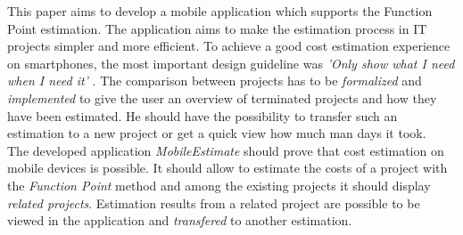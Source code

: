 This paper aims to develop a mobile application which supports the Function Point estimation. The application aims to make the estimation process in IT projects simpler and more efficient. To achieve a good cost estimation experience on smartphones, the most important design guideline was \textit{'Only show what I need when I need it'} \cite{materialdesign}. The comparison between projects has to be \textit{formalized} and \textit{implemented} to give the user an overview of terminated projects and how they have been estimated. He should have the possibility to transfer such an estimation to a new project or get a quick view how much man days it took.\\
The developed application \textit{MobileEstimate} should prove that cost estimation on mobile devices is possible. It should allow to estimate the costs of a project with the \textit{Function Point} method and among the existing projects it should display \textit{related projects}. Estimation results from a related project are possible to be viewed in the application and \textit{transfered} to another estimation.\\

